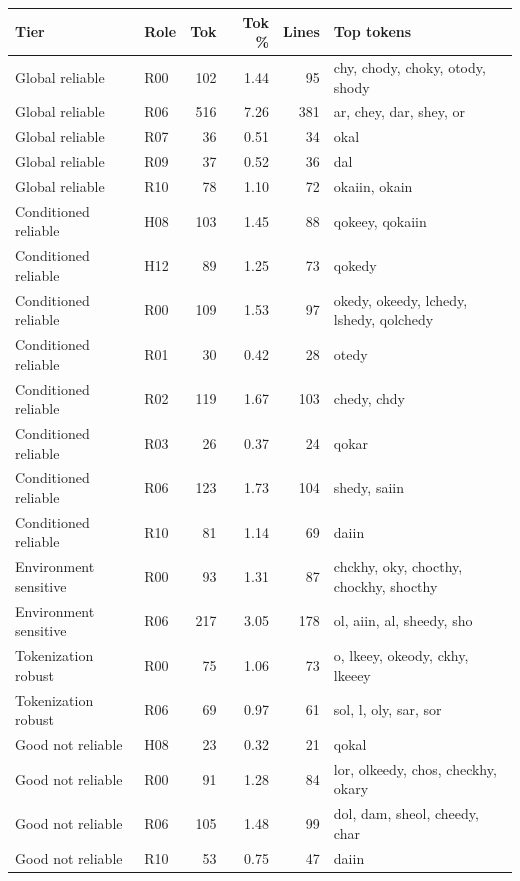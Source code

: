 \begin{tabular}{llrrrl}
\toprule
Tier & Role & Tok & Tok \% & Lines & Top tokens \\
\midrule
Global reliable & R00 & 102 & 1.44 & 95 & chy, chody, choky, otody, shody \\
Global reliable & R06 & 516 & 7.26 & 381 & ar, chey, dar, shey, or \\
Global reliable & R07 & 36 & 0.51 & 34 & okal \\
Global reliable & R09 & 37 & 0.52 & 36 & dal \\
Global reliable & R10 & 78 & 1.10 & 72 & okaiin, okain \\
Conditioned reliable & H08 & 103 & 1.45 & 88 & qokeey, qokaiin \\
Conditioned reliable & H12 & 89 & 1.25 & 73 & qokedy \\
Conditioned reliable & R00 & 109 & 1.53 & 97 & okedy, okeedy, lchedy, lshedy, qolchedy \\
Conditioned reliable & R01 & 30 & 0.42 & 28 & otedy \\
Conditioned reliable & R02 & 119 & 1.67 & 103 & chedy, chdy \\
Conditioned reliable & R03 & 26 & 0.37 & 24 & qokar \\
Conditioned reliable & R06 & 123 & 1.73 & 104 & shedy, saiin \\
Conditioned reliable & R10 & 81 & 1.14 & 69 & daiin \\
Environment sensitive & R00 & 93 & 1.31 & 87 & chckhy, oky, chocthy, chockhy, shocthy \\
Environment sensitive & R06 & 217 & 3.05 & 178 & ol, aiin, al, sheedy, sho \\
Tokenization robust & R00 & 75 & 1.06 & 73 & o, lkeey, okeody, ckhy, lkeeey \\
Tokenization robust & R06 & 69 & 0.97 & 61 & sol, l, oly, sar, sor \\
Good not reliable & H08 & 23 & 0.32 & 21 & qokal \\
Good not reliable & R00 & 91 & 1.28 & 84 & lor, olkeedy, chos, checkhy, okary \\
Good not reliable & R06 & 105 & 1.48 & 99 & dol, dam, sheol, cheedy, char \\
Good not reliable & R10 & 53 & 0.75 & 47 & daiin \\
\bottomrule
\end{tabular}